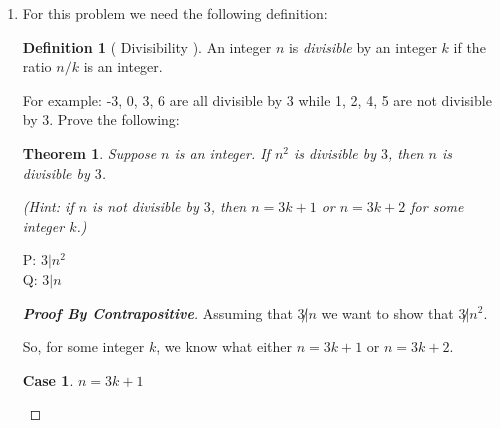 \documentclass{article} %
\theoremstyle{plain}
\newtheorem*{theorem*}{Theorem}
\theoremstyle{definition}
\newtheorem*{definition*}{Definition}
\theoremstyle{case}
\newtheorem{case}{Case}
\begin{document}
\begin{enumerate}[label={\fbox{\textbf{Exercise \#\arabic* :}}}]
P: $x \in \mathbb{I} \wedge y \in \mathbb{Q} \wedge y \neq 0$ \\
$\neg P: x \notin \mathbb{I} \vee y \notin \mathbb{Q} \vee y = 0$ \\
Q: $xy \in \mathbb{I}$ \\
$\neg Q: xy \notin \mathbb{I}$

\renewcommand\qedsymbol{\Lightning}
\begin{proof}[\textbf{Proof by contradiction}]  Towards a contradiction,
  let's assume that $x \notin \mathbb{I}$.  Then we want to show 
  $\neg Q \wedge P \implies \neg P$.  I.e.,
  $xy \notin \mathbb{I} \wedge x \in \mathbb{I} $ leads to a
  contradiction.

  Since $y \in \mathbb{Q}$ then there exists $\{ p,q \in \mathbb{Z}: \}$
  such that
    \[y = \frac{p}{q} \]
  And, Since $xy \in \mathbb{Q}$, there exists $\{ m,n \in \mathbb{Z}: \}$
  such that
    \[ xy = x \cdot \frac{p}{q} = \frac{m}{n} \]
  And so,
  \[ x = \frac{mq}{pn} \] 
  But then $\frac{mq}{pn}$ is rational since the multiplication of two
  integers is an integer.  So $x$ must be irrational.

\end{proof} 
\renewcommand\qedsymbol{$\square$}

\newpage
\item For this problem we need the following definition: 
  \begin{definition*}[ Divisibility ]
    An integer $n$ is \emph{divisible} by an integer $k$ if the ratio $n/k$ is an integer. 
  \end{definition*}
  For example: -3, 0, 3, 6 are all divisible by 3 while 1, 2, 4, 5 are not divisible by 3.  Prove the following: 

\begin{theorem*} Suppose $n$ is an integer. If $n^2$ is divisible by $3$, then $n$ is divisible by $3$. 

\end{theorem*}
\emph{(Hint: if $n$ is not divisible by $3$, then $n=3k+1$ or $n=3k+2$ for some integer $k$.)}

P: $ 3 | n^2 $\\
Q:  $ 3 | n $

\begin{proof}[\textbf{Proof By Contrapositive}]
  Assuming that $3 \not| n$ we want to show that $3 \not| n^2$.

  So, for some integer $k$, we know what either $n = 3k + 1$ or $n=3k + 2$.
    \begin{case}
      $n = 3k + 1$ 


\end{case}
\end{proof}
\end{enumerate}
\end{document}
